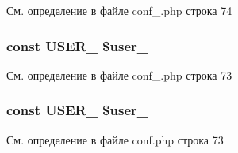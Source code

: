 См. определение в файле conf\-\_\-.\-php строка 74

\hypertarget{group___d_b__1_ga2b39766e2bf04cce22a7deee95879619}{
\subsubsection[{U\-S\-E\-R\-\_\-1}]{\setlength{\rightskip}{0pt plus 5cm}const U\-S\-E\-R\-\_ \$user\-\_}}\label{group___d_b__1_ga2b39766e2bf04cce22a7deee95879619}


См. определение в файле conf\-\_\-.\-php строка 73

\hypertarget{group___d_b__1_ga2b39766e2bf04cce22a7deee95879619}{
\subsubsection[{U\-S\-E\-R\-\_\-1}]{\setlength{\rightskip}{0pt plus 5cm}const U\-S\-E\-R\-\_ \$user\-\_}}\label{group___d_b__1_ga2b39766e2bf04cce22a7deee95879619}


См. определение в файле conf.\-php строка 73

